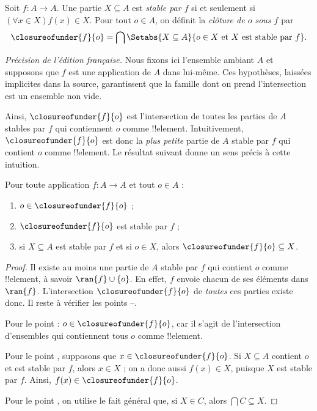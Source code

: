 \documentclass[11pt,a4paper,openany]{memoir}
\begin{document}
\begin{defn}
	Soit $f\colon A\to A$. Une partie $X\subseteq A$ est
	\emph{stable par $f$} si et seulement si
	$(\forall x \in X)f(x) \in X$. Pour tout $o\in A$, on définit la
	\emph{clôture de $o$ sous $f$} par
	$$\closureofunder{f}{o} = \bigcap\Setabs{X\subseteq A}{o \in X\text{ et }X
\text{ est stable par }f}.$$
\end{defn}
\noindent\emph{Précision de l'édition française.} Nous fixons ici l'ensemble
ambiant $A$ et supposons que $f$ est une application de $A$ dans lui-même.
Ces hypothèses, laissées implicites dans la source, garantissent que la
famille dont on prend l'intersection est un ensemble non vide.

Ainsi, $\closureofunder{f}{o}$ est l'intersection de toutes les parties
de $A$ stables par $f$ qui contiennent $o$ comme !!{element}.
Intuitivement, $\closureofunder{f}{o}$ est donc la \emph{plus petite}
partie de $A$ stable par $f$ qui contient $o$ comme !!{element}.
Le résultat suivant donne un sens précis à cette intuition.
\begin{lem}
	Pour toute application $f\colon A\to A$ et tout $o \in A$ :
	\begin{enumerate}
		\item{} $o \in \closureofunder{f}{o}$ ;
		\item{} $\closureofunder{f}{o}$ est stable par $f$ ;
		\item{} si $X\subseteq A$ est stable par $f$
		et si $o \in X$, alors $\closureofunder{f}{o} \subseteq X$.
	\end{enumerate}
\end{lem}

\begin{proof}
Il existe au moins une partie de $A$ stable par $f$ qui contient $o$
comme !!{element}, à savoir $\ran{f}\cup\{o\}$.
En effet, $f$ envoie chacun de ses éléments dans $\ran{f}$.
L'intersection $\closureofunder{f}{o}$ de \emph{toutes} ces parties
existe donc. Il reste à vérifier les points
--.

Pour le point  :
$o \in \closureofunder{f}{o}$, car il s'agit de l'intersection
d'ensembles qui contiennent tous $o$ comme !!{element}.

Pour le point , supposons que
$x \in \closureofunder{f}{o}$. Si $X\subseteq A$ contient $o$
et est stable par $f$, alors $x \in X$ ; on a donc aussi $f(x) \in X$,
puisque $X$ est stable par $f$. Ainsi,
$f(x) \in \closureofunder{f}{o}$.

Pour le point , on utilise le fait général
que, si $X \in C$, alors $\bigcap C \subseteq X$.
\end{proof}
\end{document}
